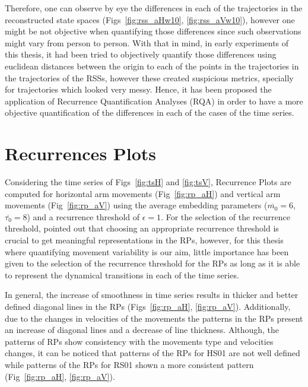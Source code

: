 Therefore, one can observe by eye the differences in each of the trajectories 
in the reconstructed state spaces 
(Figs~\ref{fig:rss_aHw10}, \ref{fig:rss_aVw10}), 
however one might be not objective when quantifying those differences 
since such observations might vary from person to person.
With that in mind, in early experiments of this thesis, 
it had been tried to objectively quantify those differences 
using euclidean distances between 
the origin to each of the points in the trajectories in the trajectories of 
the RSSs, however these created suspicious metrics, specially 
for trajectories which looked very messy.
Hence, it has been proposed the application of 
Recurrence Quantification Analyses (RQA) 
in order to have a more objective quantification of the differences 
in each of the cases of the time series.

\newpage
\section{Recurrences Plots}
Considering the time series of Figs~\ref{fig:tsH} and \ref{fig:tsV}, 
Recurrence Plots are computed for horizontal arm movements  
(Fig~\ref{fig:rp_aH}) and vertical arm movements (Fig~\ref{fig:rp_aV}) 
using the average embedding parameters 
($\overline{m_0}=6$, $\overline{\tau_0}=8$) 
and a recurrence threshold of $\epsilon=1$. 
For the selection of the recurrence threshold,
\cite{marwan2011} pointed out that choosing an appropriate 
recurrence threshold is crucial to get meaningful representations in the RPs, 
however, for this thesis where quantifying movement variability is our aim,
little importance has been given to the selection of the recurrence threshold 
for the RPs as long as it is able to represent the dynamical transitions 
in each of the time series.

In general, the increase of smoothness in time series results in thicker 
and better defined diagonal lines in the RPs 
(Figs~\ref{fig:rp_aH}, \ref{fig:rp_aV}).
Additionally, due to the changes in velocities of the movements 
the patterns in the RPs present an increase of diagonal lines 
and a decrease of line thickness.
Although, the patterns of RPs show consistency with the movements type 
and velocities changes, it can be noticed that patterns of the RPs for 
HS01 are not well defined while patterns of the RPs for RS01 
shown a more consistent pattern (Fig~\ref{fig:rp_aH}, \ref{fig:rp_aV}). 

